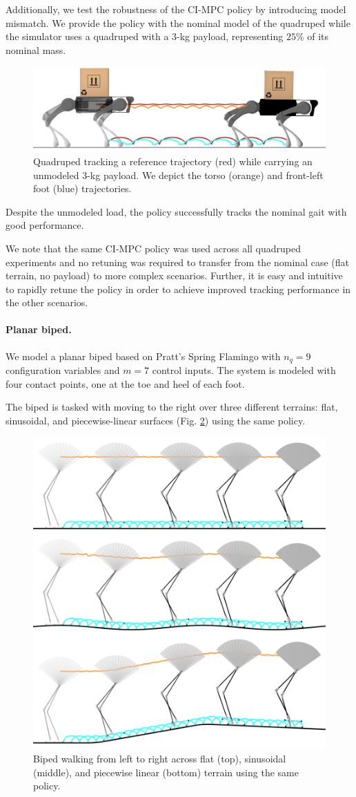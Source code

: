 Additionally, we test the robustness of the CI-MPC policy by introducing model mismatch. We provide the policy with the nominal model of the quadruped while the simulator uses a quadruped with a $3$-kg payload, representing $25\%$ of its nominal mass. 

\begin{figure}[H]
	\centering
	\includegraphics[width=.45\textwidth]{ci_pc/quadruped_payload_cardboard_red.png}
	\caption[Planar quadruped locomotion with model mismatch]{Quadruped tracking a reference trajectory (red) while carrying an unmodeled $3$-kg payload. We depict the torso (orange) and front-left foot (blue) trajectories.}
	\label{cipc_quadruped_payload}
\end{figure}

Despite the unmodeled load, the policy successfully tracks the nominal gait with good performance. 

We note that the same CI-MPC policy was used across all quadruped experiments and no retuning was required to transfer from the nominal case (flat terrain, no payload) to more complex scenarios. Further, it is easy and intuitive to rapidly retune the policy in order to achieve improved tracking performance in the 
other scenarios.

\paragraph{Planar biped.}
We model a planar biped based on Pratt's Spring Flamingo \cite{pratt2000thesis} with $n_q = 9$ configuration variables and $m = 7$ control inputs. The system is modeled with four contact points, one at the toe and heel of each foot.

The biped is tasked with moving to the right over three different terrains: flat, sinusoidal, and piecewise-linear surfaces (Fig. \ref{cipc_biped_tracking}) using the same policy. 

\begin{figure}[H]
	\centering
	\includegraphics[width=.45\textwidth]{ci_pc/flamingo_ghost.png}
	\caption[Planar biped locomotion over unmodeled terrain]{Biped walking from left to right across flat (top), sinusoidal (middle), and piecewise linear (bottom) terrain using the same policy.}
	\label{cipc_biped_tracking}
\end{figure}

